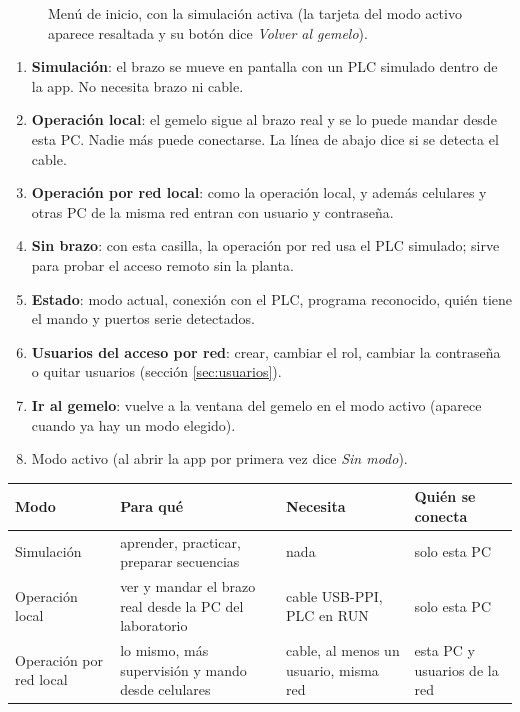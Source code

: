 \begin{figure}[H]
\centering
{}
\caption{Menú de inicio, con la simulación activa (la tarjeta del modo activo aparece resaltada y su botón dice \emph{Volver al gemelo}).}
\end{figure}
\begin{enumerate}[label=\num{\arabic*}, leftmargin=9mm]
\item \textbf{Simulación}: el brazo se mueve en pantalla con un PLC simulado dentro de la app. No necesita brazo ni cable.
\item \textbf{Operación local}: el gemelo sigue al brazo real y se lo puede mandar desde esta PC. Nadie más puede conectarse. La línea de abajo dice si se detecta el cable.
\item \textbf{Operación por red local}: como la operación local, y además celulares y otras PC de la misma red entran con usuario y contraseña.
\item \textbf{Sin brazo}: con esta casilla, la operación por red usa el PLC simulado; sirve para probar el acceso remoto sin la planta.
\item \textbf{Estado}: modo actual, conexión con el PLC, programa reconocido, quién tiene el mando y puertos serie detectados.
\item \textbf{Usuarios del acceso por red}: crear, cambiar el rol, cambiar la contraseña o quitar usuarios (sección \ref{sec:usuarios}).
\item \textbf{Ir al gemelo}: vuelve a la ventana del gemelo en el modo activo (aparece cuando ya hay un modo elegido).
\item Modo activo (al abrir la app por primera vez dice \emph{Sin modo}).
\end{enumerate}

\begin{center}\small
\begin{tabularx}{\linewidth}{>{\raggedright}p{3.2cm} >{\raggedright}X >{\raggedright}X >{\raggedright\arraybackslash}p{3.3cm}}
\toprule
\textbf{Modo} & \textbf{Para qué} & \textbf{Necesita} & \textbf{Quién se conecta}\\
\midrule
Simulación & aprender, practicar, preparar secuencias & nada & solo esta PC\\
Operación local & ver y mandar el brazo real desde la PC del laboratorio & cable USB-PPI, PLC en RUN & solo esta PC\\
Operación por red local & lo mismo, más supervisión y mando desde celulares & cable, al menos un usuario, misma red & esta PC y usuarios de la red\\
\bottomrule
\end{tabularx}
\end{center}

